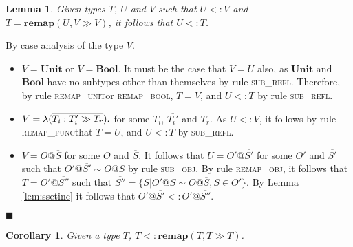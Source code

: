 \documentclass{article}
\newtheorem{lem}{Lemma}
\newtheorem{cor}{Corollary}
\newcommand{\lemref}[1]{Lemma \ref{#1}}
\newcommand{\subrefl}{\textsc{sub\_refl}}
\newcommand{\subobj}{\textsc{sub\_obj}}
\newcommand{\remapunit}{\textsc{remap\_unit}}
\newcommand{\remapbool}{\textsc{remap\_bool}}
\newcommand{\remapfunc}{\textsc{remap\_func}}
\newcommand{\remapobj}{\textsc{remap\_obj}}
\newcommand{\remapapp}[3]{\ensuremath{\mathbf{remap}(#1, #2 \gg #3)}}
\newcommand{\unitt}{\mathbf{Unit}}
\newcommand{\boolt}{\mathbf{Bool}}
\newcommand{\funv}[4]{\lambda(\overline{#1 : #2 \gg #3}).#4}
\newcommand{\qed}{$\blacksquare$}
\newenvironment{proof}{\vspace{1ex}\noindent{\bf Proof}\hspace{0.5em}}
  {\hfill\qed\vspace{1ex}}
\begin{document}
\begin{lem}
\label{lem:remapeff}
Given types $T$, $U$ and $V$ such that $U <: V$ and $T = \remapapp{U}{V}{V}$, 
it follows that $U <: T$.
\end{lem}
\begin{proof}
By case analysis of the type $V$.

\begin{itemize}
\item $V = \unitt$ or $V = \boolt$. 
It must be the case that $V = U$ also, as $\unitt$ and $\boolt$
have no subtypes other than themselves by rule \subrefl.
Therefore, by rule \remapunit or \remapbool, $T = V$,
and $U <: T$ by rule \subrefl.

\item $V = \funv{T_i}{T_i'}{T_r}$ for some $\overline{T_i}$, $\overline{T_i'}$
and $T_r$. As $U <: V$, it follows by rule \remapfunc that
$T = U$, and $U <: T$ by \subrefl.

\item $V = O@\overline{S}$ for some $O$ and $\overline{S}$. 
It follows that $U = O'@\overline{S'}$ 
for some $O'$ and $\overline{S'}$ 
such that $O'@\overline{S'} \sim O@\overline{S}$ 
by rule \subobj. 
By rule \remapobj, it follows that $T = O'@\overline{S''}$ 
such that $\overline{S''} = \{ S | O'@S \sim O@\overline{S}, S \in O' \}$.
By \lemref{lem:ssetinc} it follows that 
$O'@\overline{S'} <: O'@\overline{S''}$.

\end{itemize}
\end{proof}

\begin{cor}
\label{lem:remapsame}
Given a type $T$, $T <: \remapapp{T}{T}{T}$.
\end{cor}
\end{document}
